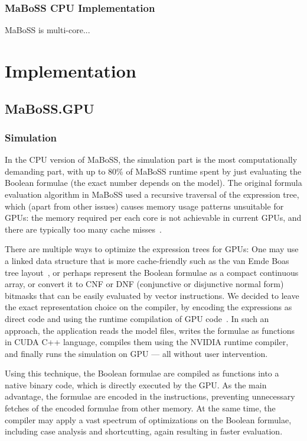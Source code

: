 \documentclass[sn-mathphys-num]{sn-jnl}%
\begin{document}
\subsubsection{MaBoSS CPU Implementation}
MaBoSS is multi-core...

\section{Implementation}\label{sec:implementation}

\subsection{MaBoSS.GPU}

\subsubsection*{Simulation}

In the CPU version of MaBoSS, the simulation part is the most computationally demanding part, with up to 80\% of MaBoSS runtime spent by just evaluating the Boolean formulae (the exact number depends on the model). The original formula evaluation algorithm in MaBoSS used a recursive traversal of the expression tree, which (apart from other issues) causes memory usage patterns unsuitable for GPUs: the memory required per each core is not achievable in current GPUs, and there are typically too many cache misses~\cite{karlsson2000prefetching}.

There are multiple ways to optimize the expression trees for GPUs: One may use a linked data structure that is more cache-friendly such as the van Emde Boas tree layout~\cite{van1975preserving}, or perhaps represent the Boolean formulae as a compact continuous array, or convert it to CNF or DNF (conjunctive or disjunctive normal form) bitmasks that can be easily evaluated by vector instructions. We decided to leave the exact representation choice on the compiler, by encoding the expressions as direct code and using the runtime compilation of GPU code~\cite{nvrtc}. In such an approach, the application reads the model files, writes the formulae as functions in CUDA C++ language, compiles them using the NVIDIA runtime compiler, and finally runs the simulation on GPU --- all without user intervention.

Using this technique, the Boolean formulae are compiled as functions into a native binary code, which is directly executed by the GPU. As the main advantage, the formulae are encoded in the instructions, preventing unnecessary fetches of the encoded formulae from other memory. At the same time, the compiler may apply a vast spectrum of optimizations on the Boolean formulae, including case analysis and shortcutting, again resulting in faster evaluation.
\end{document}
